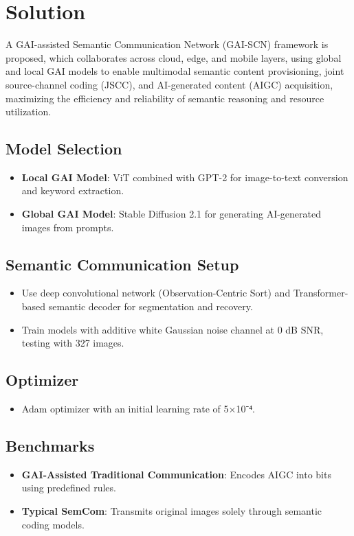\documentclass{article}
\begin{document}
\section{Solution}

A GAI-assisted Semantic Communication Network (GAI-SCN) framework is proposed, which collaborates across cloud, edge, and mobile layers, using global and local GAI models to enable multimodal semantic content provisioning, joint source-channel coding (JSCC), and AI-generated content (AIGC) acquisition, maximizing the efficiency and reliability of semantic reasoning and resource utilization.

\subsection{Model Selection}
\begin{itemize}
    \item \textbf{Local GAI Model}: ViT combined with GPT-2 for image-to-text conversion and keyword extraction.
    \item \textbf{Global GAI Model}: Stable Diffusion 2.1 for generating AI-generated images from prompts.
\end{itemize}

\subsection{Semantic Communication Setup}
\begin{itemize}
    \item Use deep convolutional network (Observation-Centric Sort) and Transformer-based semantic decoder for segmentation and recovery.
    \item Train models with additive white Gaussian noise channel at 0 dB SNR, testing with 327 images.
\end{itemize}

\subsection{Optimizer}
\begin{itemize}
    \item Adam optimizer with an initial learning rate of 5×10⁻⁴.
\end{itemize}

\subsection{Benchmarks}
\begin{itemize}
    \item \textbf{GAI-Assisted Traditional Communication}: Encodes AIGC into bits using predefined rules.
    \item \textbf{Typical SemCom}: Transmits original images solely through semantic coding models.
\end{itemize}
\end{document}
